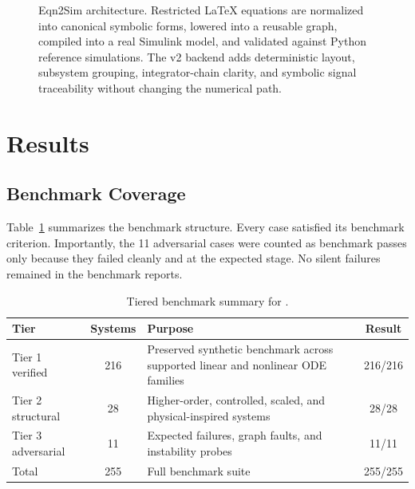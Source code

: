 \documentclass[colorlinks,upint,subscriptcorrection,varvw,balance,nofoot]{asmeconf}
\begin{document}
\begin{figure}[t]
{
}
\caption{Eqn2Sim architecture. Restricted \LaTeX{} equations are normalized into canonical symbolic forms, lowered into a reusable graph, compiled into a real Simulink model, and validated against Python reference simulations. The v2 backend adds deterministic layout, subsystem grouping, integrator-chain clarity, and symbolic signal traceability without changing the numerical path.}
\label{fig:pipeline}
\end{figure}

\section{Results}
\subsection{Benchmark Coverage}
Table~\ref{tab:tiers} summarizes the benchmark structure. Every case satisfied its benchmark criterion. Importantly, the 11 adversarial cases were counted as benchmark passes only because they failed cleanly and at the expected stage. No silent failures remained in the benchmark reports.

\begin{table}[t]
\caption{Tiered benchmark summary for .}
\label{tab:tiers}
\centering
\begin{tabularx}{\columnwidth}{@{}l c X c@{}}
\toprule
Tier & Systems & Purpose & Result \\
\midrule
Tier 1 verified & 216 & Preserved synthetic benchmark across supported linear and nonlinear ODE families & 216/216 \\
Tier 2 structural & 28 & Higher-order, controlled, scaled, and physical-inspired systems & 28/28 \\
Tier 3 adversarial & 11 & Expected failures, graph faults, and instability probes & 11/11 \\
\midrule
Total & 255 & Full benchmark suite & 255/255 \\
\bottomrule
\end{tabularx}
\end{table}
\end{document}
